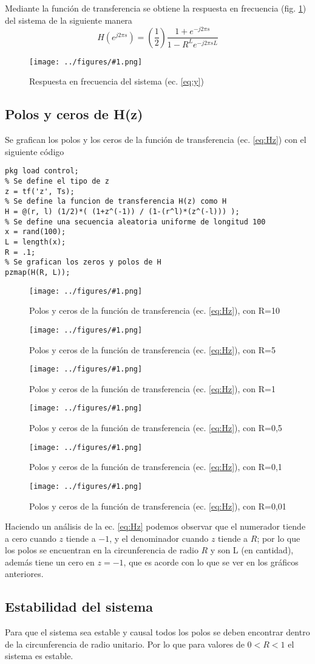 \documentclass[letterpaper, 10 pt, conference]{ieeeconf}  %
\newcommand{\image}[2] {
  \begin{figure}[H]
    \centering
    \texttt{[image: ../figures/\#1.png]}
    \caption{#2}
    \label{fig:#1}
  \end{figure}
}
\begin{document}
Mediante la funci\'on de transferencia se obtiene la respuesta en frecuencia (fig. \ref{fig:HfreqResp}) del sistema de la siguiente manera
\begin{equation*}
  H(e^{j2{\pi}s}) = (\frac{1}{2})\frac{1 + {e^{-j2{\pi}s}}}{1 - R^{L}{e^{-j2{\pi}sL}}}
\end{equation*}
\image{HfreqResp}{Respuesta en frecuencia del sistema (ec. \ref{eq:y})}

\subsection{Polos y ceros de H(z)}
Se grafican los polos y los ceros de la funci\'on de transferencia (ec. \ref{eq:Hz}) con el siguiente c\'odigo
\begin{lstlisting}[style=Matlab-editor]
% tf y pzmap son del paquete de control
pkg load control;
% Se define el tipo de z
z = tf('z', Ts);
% Se define la funcion de transferencia H(z) como H
H = @(r, l) (1/2)*( (1+z^(-1)) / (1-(r^l)*(z^(-l))) );
% Se define una secuencia aleatoria uniforme de longitud 100
x = rand(100);
L = length(x);
R = .1;
% Se grafican los zeros y polos de H
pzmap(H(R, L));
\end{lstlisting}

\image{Hz-pzmap-1}{Polos y ceros de la función de transferencia (ec. \ref{eq:Hz}), con R=10}
\image{Hz-pzmap-2}{Polos y ceros de la función de transferencia (ec. \ref{eq:Hz}), con R=5}
\image{Hz-pzmap-3}{Polos y ceros de la función de transferencia (ec. \ref{eq:Hz}), con R=1}
\image{Hz-pzmap-4}{Polos y ceros de la función de transferencia (ec. \ref{eq:Hz}), con R=0,5}
\image{Hz-pzmap-5}{Polos y ceros de la función de transferencia (ec. \ref{eq:Hz}), con R=0,1}
\image{Hz-pzmap-6}{Polos y ceros de la función de transferencia (ec. \ref{eq:Hz}), con R=0,01}

Haciendo un an\'alisis de la ec. \ref{eq:Hz} podemos observar que el numerador tiende a cero cuando $z$ tiende a $-1$, y el denominador cuando $z$ tiende a $R$; por lo que los polos se encuentran en la circunferencia de radio $R$ y son L (en cantidad), adem\'as tiene un cero en $z=-1$, que es acorde con lo que se ver en los gr\'aficos anteriores.

\subsection{Estabilidad del sistema}
Para que el sistema sea estable y causal todos los polos se deben encontrar dentro de la circunferencia de radio unitario. Por lo que para valores de $0<R<1$ el sistema es estable.
\end{document}
